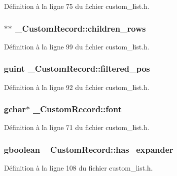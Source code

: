 Définition à la ligne 75 du fichier custom\_\-list.h.

\subsubsection[{children\_\-rows}]{$\ast$$\ast$ {\bf \_\-CustomRecord::children\_\-rows}}\label{struct__CustomRecord_a506c3e4c886c288e96779983b07f0b25}


Définition à la ligne 99 du fichier custom\_\-list.h.

\subsubsection[{filtered\_\-pos}]{\setlength{\rightskip}{0pt plus 5cm}guint {\bf \_\-CustomRecord::filtered\_\-pos}}\label{struct__CustomRecord_a19ee376d753e226f8e3586b3cda43d3c}


Définition à la ligne 92 du fichier custom\_\-list.h.

\subsubsection[{font}]{\setlength{\rightskip}{0pt plus 5cm}gchar$\ast$ {\bf \_\-CustomRecord::font}}\label{struct__CustomRecord_a2eaa7f95e03924522ad36bed9c9f8be5}


Définition à la ligne 71 du fichier custom\_\-list.h.

\subsubsection[{has\_\-expander}]{\setlength{\rightskip}{0pt plus 5cm}gboolean {\bf \_\-CustomRecord::has\_\-expander}}\label{struct__CustomRecord_a01f034ff9327573d1163bc7b6ec6b02f}


Définition à la ligne 108 du fichier custom\_\-list.h.


